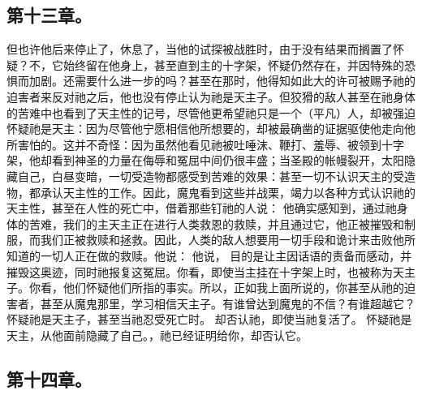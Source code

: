 
\subsection{第十三章。}

\par

但也许他后来停止了，休息了，当他的试探被战胜时，由于没有结果而搁置了怀疑？不，它始终留在他身上，甚至直到主的十字架，怀疑仍然存在，并因特殊的恐惧而加剧。还需要什么进一步的吗？甚至在那时，他得知如此大的许可被赐予祂的迫害者来反对祂之后，他也没有停止认为祂是天主子。但狡猾的敌人甚至在祂身体的苦难中也看到了天主性的记号，尽管他更希望祂只是一个（平凡）人，却被强迫怀疑祂是天主：因为尽管他宁愿相信他所想要的，却被最确凿的证据驱使他走向他所害怕的。这并不奇怪：因为虽然他看见祂被吐唾沫、鞭打、羞辱、被领到十字架，他却看到神圣的力量在侮辱和冤屈中间仍很丰盛；当圣殿的帐幔裂开，太阳隐藏自己，白昼变暗，一切受造物都感受到苦难的效果：甚至一切不认识天主的受造物，都承认天主性的工作。因此，魔鬼看到这些并战栗，竭力以各种方式认识祂的天主性，甚至在人性的死亡中，借着那些钉祂的人说： 他确实感知到，通过祂身体的苦难，我们的主天主正在进行人类救恩的救赎，并且通过它，他正被摧毁和制服，而我们正被救赎和拯救。因此，人类的敌人想要用一切手段和诡计来击败他所知道的一切人正在做的救赎。他说： 他说， 目的是让主因话语的责备而感动，并摧毁这奥迹，同时祂报复这冤屈。你看，即使当主挂在十字架上时，也被称为天主子。你看，他们怀疑他们所指的事实。所以，正如我上面所说的，你甚至从祂的迫害者，甚至从魔鬼那里，学习相信天主子。有谁曾达到魔鬼的不信？有谁超越它？ 怀疑祂是天主子，甚至当祂忍受死亡时。 却否认祂，即使当祂复活了。 怀疑祂是天主，从他面前隐藏了自己。，祂已经证明给你，却否认它。\par


\subsection{第十四章。}

\par

